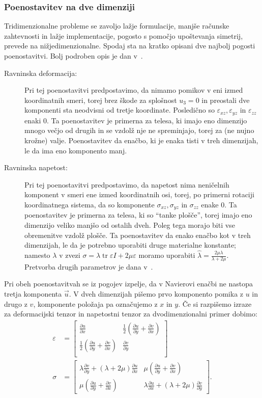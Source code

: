 \documentclass[12pt,a4paper,twoside]{article}
\theoremstyle{definition} %
\theoremstyle{plain} %
\numberwithin{equation}{section}
\newcommand{\eps}{\varepsilon}
\newcommand{\dpar}[2]{\ensuremath{\frac{\partial #1}{\partial #2}}}
\newcommand{\vu}{\vec{u}}
\newcommand{\ts}{\sigma}
\DeclareMathOperator{\tr}{tr}
\begin{document}
\subsubsection{Poenostavitev na dve dimenziji}
Tridimenzionalne probleme se zavoljo lažje formulacije, manjše računske zahtevnosti in lažje
implementacije, pogosto s pomočjo upoštevanja simetrij, prevede na nižjedimenzionalne. Spodaj sta na
kratko opisani dve najbolj pogosti poenostavitvi. Bolj podroben opis je dan
v~\cite[str.~260--278]{slaughter2012linearized}.

\begin{description}
  \item[Ravninska deformacija:]
    Pri tej poenostavitvi predpostavimo, da nimamo pomikov v eni izmed koordinatnih smeri, torej
    brez škode za splošnost $u_3 = 0$ in preostali dve komponenti sta neodvisni od tretje
    koordinate.  Posledično so $\eps_{xz}, \eps_{yz}$ in $\eps_{zz}$ enaki 0.  Ta poenostavitev je
    primerna za telesa, ki imajo eno dimenzijo mnogo večjo od drugih in se vzdolž nje ne
    spreminjajo, torej za (ne nujno krožne) valje.  Poenostavitev da enačbo, ki je enaka tisti v
    treh dimenzijah, le da ima eno komponento manj.
  \item[Ravninska napetost:]
    Pri tej poenostavitvi predpostavimo, da napetost nima neničelnih komponent v smeri ene izmed
    koordinatnih osi, torej, po primerni rotaciji koordinatnega sistema, da so komponente $\ts_{xz},
    \ts_{yz}$ in $\ts_{zz}$ enake 0. Ta poenostavitev je primerna za telesa, ki so ``tanke plošče'',
    torej imajo eno dimenzijo veliko manjšo od ostalih dveh. Poleg tega morajo biti vse obremenitve
    vzdolž plošče. Ta poenostavitev da enako enačbo kot v treh dimenzijah, le da je potrebno
    uporabiti druge materialne konstante; namesto $\lambda$ v zvezi $\sigma = \lambda \tr\eps I + 2
    \mu \eps$ moramo uporabiti $\hat\lambda = \frac{2 \mu \lambda}{\lambda + 2 \mu}$. Pretvorba
    drugih parametrov je dana v~\cite[str.\ 276, tabela 7.1]{slaughter2012linearized}.
\end{description}

Pri obeh poenostavitvah se iz pogojev izpelje, da v Navierovi enačbi ne nastopa tretja komponenta
$\vu$. V dveh dimenzijah pišemo prvo komponento pomika z $u$ in drugo z $v$, komponente položaja pa
označujemo z $x$ in $y$.  Če si razpišemo izraze za deformacijski tenzor in napetostni tenzor za
dvodimenzionalni primer dobimo:
\begin{align}
  \eps &=
  \begin{bmatrix}
    \dpar{u}{x} & \frac12(\dpar{u}{y} + \dpar{v}{x}) \\
    \frac12(\dpar{u}{y} + \dpar{v}{x}) & \dpar{v}{y} \\
  \end{bmatrix}
  \\
  \ts &=
  \begin{bmatrix}
    \lambda \dpar{v}{y} + (\lambda+2\mu) \dpar{u}{x} &
    \mu(\dpar{u}{y} + \dpar{v}{x}) \\
    \mu(\dpar{u}{y} + \dpar{v}{x}) &
    \lambda \dpar{u}{x} + (\lambda+2\mu) \dpar{v}{y}
  \end{bmatrix}.
\end{align}
\end{document}

